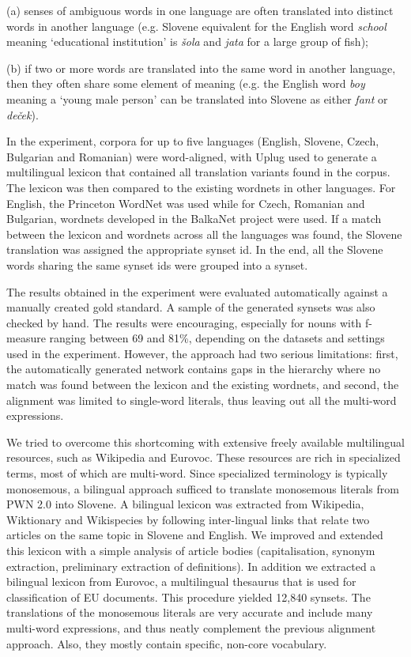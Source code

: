 \documentclass[output=paper]{LSP/langsci}
\begin{document}
(a) senses of ambiguous words in one language are often translated into distinct words in another language (e.g. Slovene equivalent for the English word \textit{school} meaning `educational institution' is \textit{šola} and \textit{jata} for a large group of fish);

(b) if two or more words are translated into the same word in another language, then they often share some element of meaning (e.g. the English word \textit{boy} meaning a `young male person' can be translated into Slovene as either \textit{fant} or \textit{deček}).

In the experiment, corpora for up to five languages (English, Slovene, Czech, Bulgarian and Romanian) were word-aligned, with Uplug \citep{Tiedemann2003} used to generate a multilingual lexicon that contained all translation variants found in the corpus. The lexicon was then compared to the existing wordnets in other languages. For English, the Princeton WordNet \citep{Fellbaum1998} was used while for Czech, Romanian and Bulgarian, wordnets developed in the BalkaNet project \citep{Tufis2000} were used. If a match between the lexicon and wordnets across all the languages was found, the Slovene translation was assigned the appropriate synset id. In the end, all the Slovene words sharing the same synset ids were grouped into a synset.

The results obtained in the experiment were evaluated automatically against a manually created gold standard. A sample of the generated synsets was also checked by hand. The results were encouraging, especially for nouns with f-measure ranging between 69 and 81\%, depending on the datasets and settings used in the experiment. However, the approach had two serious limitations: first, the automatically generated network contains gaps in the hierarchy where no match was found between the lexicon and the existing wordnets, and second, the alignment was limited to single-word literals, thus leaving out all the multi-word expressions.

We tried to overcome this shortcoming with extensive freely available multilingual resources, such as Wikipedia and Eurovoc. These resources are rich in specialized terms, most of which are multi-word. Since specialized terminology is typically monosemous, a bilingual approach sufficed to translate monosemous literals from PWN 2.0 into Slovene. A bilingual lexicon was extracted from Wikipedia, Wiktionary and Wikispecies by following inter-lingual links that relate two articles on the same topic in Slovene and English. We improved and extended this lexicon with a simple analysis of article bodies (capitalisation, synonym extraction, preliminary extraction of definitions). In addition we extracted a bilingual lexicon from Eurovoc, a multilingual thesaurus that is used for classification of EU documents. This procedure yielded 12,840 synsets. The translations of the monosemous literals are very accurate and include many multi-word expressions, and thus neatly complement the previous alignment approach. Also, they mostly contain specific, non-core vocabulary.
\end{document}
